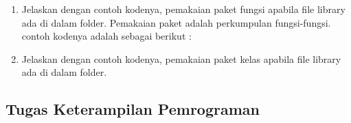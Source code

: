 \begin{enumerate}
\item Jelaskan dengan contoh kodenya, pemakaian paket fungsi apabila file library ada di dalam folder.\newline
Pemakaian paket adalah perkumpulan fungsi-fungsi. contoh kodenya adalah sebagai berikut :


\item Jelaskan dengan contoh kodenya, pemakaian paket kelas apabila file library ada
di dalam folder.\newline

\end{enumerate}

\subsection{Tugas Keterampilan Pemrograman}
